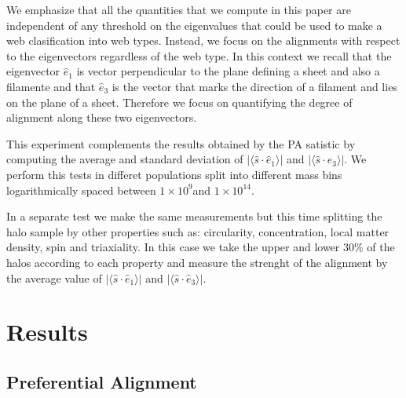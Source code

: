 \documentclass[useAMS,usenatbib]{mn2e}
\newcommand{\hMsun}{{\ifmmode{h^{-1}{\rm
        {M_{\odot}}}}\else{$h^{-1}{\rm{M_{\odot}}}$}\fi}}
\begin{document}
We emphasize that all the quantities that we compute in this paper are
independent of any threshold on the eigenvalues that could be used to make a web
clasification into web types. Instead, we focus on the alignments with
respect to the eigenvectors regardless of the web type. In this
context we recall that the eigenvector $\hat{e}_1$ is vector
perpendicular to the plane defining a sheet and also a filamente and
that $\hat{e}_3$ is the vector that marks the direction of a filament
and lies on the plane of a sheet. Therefore we focus on quantifying
the degree of alignment along these two eigenvectors. 

This experiment complements the results obtained by the PA satistic by
computing the average and standard deviation of
$\vert\langle\hat{s}\cdot\hat{e}_1\rangle\vert$ and
$\vert\langle\hat{s}\cdot\hat{e}_3\rangle\vert$.  We perform this
tests in differet populations split into different mass bins
logarithmically spaced between $1\times 10^{9}$\hMsun and
$1\times10^{14}$\hMsun.  

In a separate test we make the same measurements but this time
splitting the halo sample by other properties such as:
circularity, concentration, local matter density, spin and
triaxiality. In this case we take the upper and lower $30\%$ of the
halos according to each property and measure the strenght of the
alignment by the average value of
$\vert\langle\hat{s}\cdot\hat{e}_1\rangle\vert$ and
$\vert\langle\hat{s}\cdot\hat{e}_3\rangle\vert$. 

\section{Results}
\label{sec:results}


\subsection{Preferential Alignment}
\end{document}
